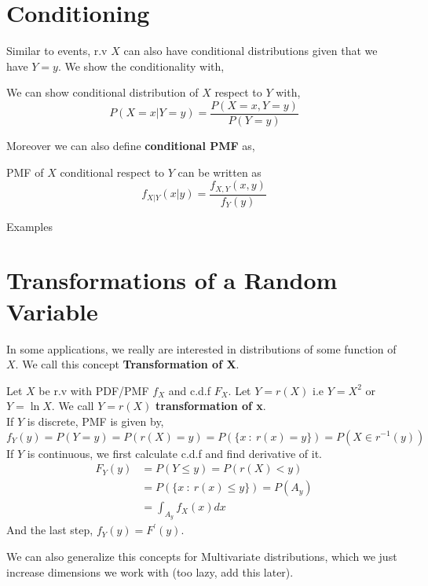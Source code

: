 \section{Conditioning}
Similar to events, r.v $X$ can also have conditional distributions given that we have $Y=y$. We show the conditionality with,
\begin{definition}
    We can show conditional distribution of $X$ respect to $Y$ with,
    \[P(X=x| Y=y) = \frac{ P(X=x,Y=y)}{P(Y=y)} \]
\end{definition}
Moreover we can also define \textbf{conditional PMF} as,
\begin{definition}
    PMF of $X$ conditional respect to $Y$ can be written as 
    \[ f_{X|Y}(x|y)= \frac{f_{X,Y}(x,y)}{f_Y(y)}\]
\end{definition}

Examples \\


\section{Transformations of a Random Variable}
In some applications, we really are interested in distributions of some function of $X$. We call this concept \textbf{Transformation of X}.
\begin{definition}
    Let $X$ be r.v with PDF/PMF $f_X$ and c.d.f $F_X$. Let $Y=r(X)$ i.e $Y=X^2$ or $Y = \ln X$. We call $Y=r(X)$ \textbf{transformation of x}. \\
    \newline
    If $Y$ is discrete, PMF is given by,
    \[f_Y(y)= P(Y=y) =  P( r(X) = y) = P( \{x \ : \ r(x) = y\})= P( X \in r^{-1}(y)) \]
    \newline
    If $Y$ is continuous, we first calculate c.d.f and find derivative of it. 
    \begin{align*}
        F_Y(y) &= P( Y \le y) = P(r(X) < y) \\
               &= P(\{x \ : \ r(x) \le y \}) = P( A_y)    \\
               &= \int_{A_y} f_X(x)dx
    \end{align*}
    And the last step, $f_Y(y) = F^{'}(y)$.
\end{definition}
We can also generalize this concepts for Multivariate distributions, which we just increase dimensions we work with (too lazy, add this later).